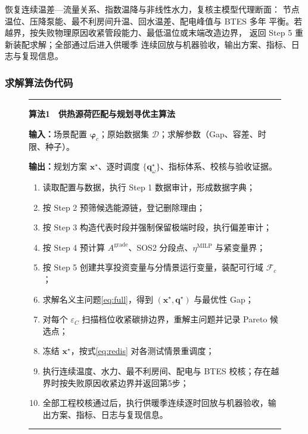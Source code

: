 \begin{description}[leftmargin=2.6em,style=nextline,itemsep=4pt]
\item[\textbf{Step 8：工程校核与约束更新。}]
恢复连续温差—流量关系、指数温降与非线性水力，复核主模型代理断面：
节点温位、压降泵能、最不利房间升温、回水温差、配电峰值与 BTES 多年
平衡。若越界，按失败物理原因收紧管段能力、最低温位或末端改造边界，
返回 Step 5 重新装配求解；全部通过后进入供暖季
连续回放与机器验收，输出方案、指标、日志与复现信息。
\end{description}

\subsubsection{求解算法伪代码}

\begin{figure}[H]
\centering
\begin{minipage}{0.94\textwidth}
\hrule\vspace{5pt}
\noindent\textbf{算法1　供热源荷匹配与规划寻优主算法}\par
\noindent\textbf{输入：}场景配置 $\bm{\varphi}_c$；原始数据集 $\mathcal D$；求解参数（Gap、容差、时限、种子）。\par
\noindent\textbf{输出：}规划方案 $\bm{x}^\star$、逐时调度 $\{\bm{q}^\star_\omega\}$、指标体系、校核与验收证据。\par
\begin{enumerate}[label=\arabic*.,leftmargin=2.2em,itemsep=1pt,topsep=3pt]
\item 读取配置与数据，执行 Step 1 数据审计，形成数据字典；
\item 按 Step 2 预筛候选能源链，登记删除理由；
\item 按 Step 3 构造代表时段并强制保留极端时段，执行偏差审计；
\item 按 Step 4 预计算 $A^{\mathrm{grade}}$、SOS2 分段点、$\eta^{\mathrm{MILP}}$ 与紧变量界；
\item 按 Step 5 创建共享投资变量与分情景运行变量，装配可行域 $\mathcal F_c$；
\item 求解名义主问题\eqref{eq:full}，得到 $(\bm{x}^\star,\bm{q}^\star)$ 与最优性 Gap；
\item 对每个 $\varepsilon_C$ 扫描档位收紧碳排边界，重解主问题并记录 Pareto 候选点；
\item 冻结 $\bm{x}^\star$，按式\eqref{eq:redis} 对各测试情景重调度；
\item 执行连续温度、水力、最不利房间、配电与 BTES 校核；存在越界时按失败原因收紧边界并返回第5步；
\item 全部工程校核通过后，执行供暖季连续逐时回放与机器验收，输出方案、指标、日志与复现信息。
\end{enumerate}
\vspace{3pt}\hrule
\end{minipage}
\label{alg:main}
\end{figure}

